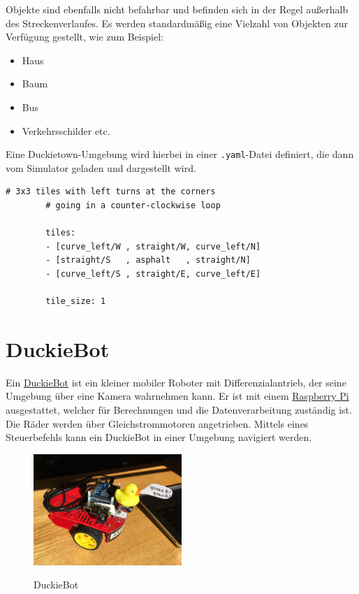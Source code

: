 Objekte sind ebenfalls nicht befahrbar und befinden sich in der Regel außerhalb des Streckenverlaufes. Es werden standardmäßig eine Vielzahl von Objekten zur Verfügung gestellt, wie zum Beispiel:

\newpage

\begin{itemize}
	\item Haus
	\item Baum
	\item Bus
	\item Verkehrsschilder etc.
\end{itemize}

Eine Duckietown-Umgebung wird hierbei in einer \texttt{.yaml}-Datei definiert, die dann vom Simulator geladen und dargestellt wird.

\hspace{1cm}
\begin{minipage}{.73\linewidth}
	\begin{lstlisting}[caption={Beispieldefinition einer Duckietown-Umgebung}]
		# 3x3 tiles with left turns at the corners
		# going in a counter-clockwise loop
	
		tiles:
		- [curve_left/W , straight/W, curve_left/N]
		- [straight/S   , asphalt   , straight/N]
		- [curve_left/S , straight/E, curve_left/E]
	
		tile_size: 1
	\end{lstlisting}
\end{minipage}

\section{DuckieBot}

Ein \href{https://get.duckietown.com/products/duckiebot-db18}{DuckieBot} ist ein kleiner mobiler Roboter mit Differenzialantrieb, der seine Umgebung über eine Kamera wahrnehmen kann. Er ist mit einem \href{https://www.raspberrypi.org/}{Raspberry Pi} ausgestattet, welcher für Berechnungen und die Datenverarbeitung zuständig ist. Die  Räder werden über Gleichstrommotoren angetrieben. Mittels eines Steuerbefehls kann ein DuckieBot in einer Umgebung navigiert werden. \cite{duckietown_platform}

\begin{figure}[H]
	\centering
	\includegraphics[width=0.5\textwidth]{kapitel2/images/duckiebot.jpg}
	\label{fig:duckiebot}
	\caption{DuckieBot}
\end{figure}


